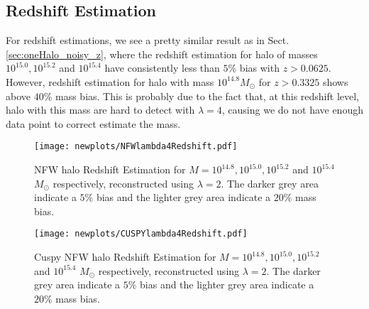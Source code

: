 \subsection{Redshift Estimation}
For redshift estimations, we see a pretty similar result as in Sect. \ref{sec:oneHalo_noisy_z}, where the redshift estimation for halo of masses $10^{15.0}, 10^{15.2}$ and $10^{15.4}$ have consistently less than $5\%$ bias with $z>0.0625$. However, redshift estimation for halo with mass $10^{14.8} M_\odot$  for $z>0.3325$ shows above $40\%$ mass bias. This is probably due to the fact that, at this redshift level, halo with this mass are hard to detect with $\lambda=4$, causing we do not have enough data point to correct estimate the mass. 
\begin{figure*}
\begin{center}
\texttt{[image: newplots/NFWlambda4Redshift.pdf]}
\caption{
    NFW halo Redshift Estimation for $M= 10^{14.8}, 10^{15.0},
    10^{15.2}$ and $10^{15.4}$ $M_{\odot}$ respectively, reconstructed using
    $\lambda=2$. The darker grey area indicate a $5\%$ bias and the lighter
    grey area indicate a $20\%$ mass bias.
    }
    \label{NoisyRedshiftBiasNFWlambda4}
\end{center}
\end{figure*}

\begin{figure*}

\begin{center}
\texttt{[image: newplots/CUSPYlambda4Redshift.pdf]}
\caption{
    Cuspy NFW halo Redshift Estimation for $M= 10^{14.8}, 10^{15.0},
    10^{15.2}$ and $10^{15.4}$ $M_{\odot}$ respectively, reconstructed using
    $\lambda=2$. The darker grey area indicate a $5\%$ bias and the lighter
    grey area indicate a $20\%$ mass bias.
    }
    \label{NoisyRedshiftBiasCuspylambda4}
\end{center}
\end{figure*}



